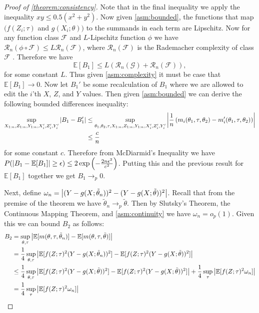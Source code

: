 \documentclass{article}
\theoremstyle{plain}
\theoremstyle{definition}
\begin{document}
\begin{proof}[Proof of \cref{theorem:consistency}]
Note that in the final inequality we apply the inequality $xy \leq 0.5(x^2 + y^2)$. Now given \cref{asm:bounded}, the functions that map $(f(Z_i;\tau)$ and $g(X_i;\theta))$ to the summands in each term are Lipschitz. Now for any function class $\mathcal F$ and $L$-Lipschitz function $\phi$ we have $\mathcal R_n(\phi \circ \mathcal F) \leq L \mathcal R_n(\mathcal F)$, where $\mathcal R_n(\mathcal F)$ is the Rademacher complexity of class $\mathcal F$ \citep[Thm.~4.12]{ledoux2013probability}. Therefore we have
\begin{equation}
    \mathbb{E}[B_1] \leq L(\mathcal{R}_n(\mathcal G) + \mathcal{R}_n(\mathcal F)) \nonumber,
\end{equation}
for some constant $L$. Thus given \cref{asm:complexity} it must be case that $\mathbb{E}[B_1] \rightarrow 0$. Now let $B_1'$ be some recalculation of $B_1$ where we are allowed to edit the $i$'th $X$, $Z$, and $Y$ values. Then given \cref{asm:bounded} we can derive the following bounded differences inequality:
\begin{align}
    \sup_{X_{1:n}, Z_{1:n}, Y_{1:n}, X_i', Z_i', Y_i'} \left|B_1 - B_1'\right| &\leq \sup_{\theta_1,\theta_2,\tau, X_{1:n}, Z_{1:n}, Y_{1:n}, X_i', Z_i', Y_i'} \left|\frac{1}{n} \left(m_i(\theta_1, \tau, \theta_2) - m_i'(\theta_1, \tau, \theta_2)\right)\right| \nonumber \\
    &\leq \frac{c}{n} \nonumber
\end{align}
for some constant $c$. Therefore from McDiarmid's Inequality we have $P(\left|B_1 - \mathbb{E}[B_1]\right| \geq \epsilon) \leq 2 \exp \left( -\frac{2n\epsilon^2}{c^2} \right)$. Putting this and the previous result for $\mathbb{E}[B_1]$ together we get $B_1 \rightarrow_p 0$.

Next, define $\omega_n = \left|(Y - g(X;\tilde\theta_n))^2 - (Y - g(X;\tilde\theta))^2\right|$. Recall that from the premise of the theorem we have $\tilde\theta_n \rightarrow_p \tilde\theta$. Then by Slutsky's Theorem, the Continuous Mapping Theorem, and \cref{asm:continuity} we have $\omega_n = o_p(1)$. Given this we can bound $B_2$ as follows:
\begin{align}
    B_2 &= \sup_{\theta,\tau} \left|\mathbb{E}[m(\theta,\tau,\tilde\theta_n)] - \mathbb{E}[m(\theta,\tau,\tilde\theta)]\right| \nonumber \\
    &= \frac{1}{4} \sup_{\theta,\tau} \left|\mathbb{E}[f(Z;\tau)^2(Y - g(X;\tilde\theta_n))^2] - \mathbb{E}[f(Z;\tau)^2(Y - g(X;\tilde\theta))^2]\right| \nonumber \\
    &\leq \frac{1}{4} \sup_{\theta,\tau} \left|\mathbb{E}[f(Z;\tau)^2(Y - g(X;\tilde\theta))^2] - \mathbb{E}[f(Z;\tau)^2(Y - g(X;\tilde\theta))^2]\right| + \frac{1}{4} \sup_{\tau} \left|\mathbb{E}[f(Z;\tau)^2 \omega_n]\right| \nonumber \\
    &= \frac{1}{4} \sup_{\tau} \left|\mathbb{E}[f(Z;\tau)^2 \omega_n]\right| \nonumber
\end{align}
%


\end{proof}
\end{document}

